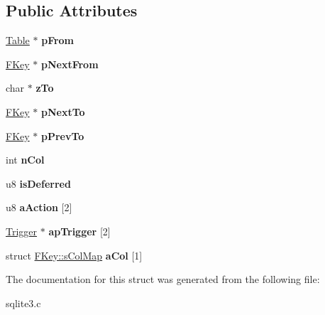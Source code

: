 \subsection*{Public Attributes}
\begin{DoxyCompactItemize}
\item 
\hypertarget{struct_f_key_a6d476f3fbfa75a19c5c5a9edec4e79eb}{\hyperlink{struct_table}{Table} $\ast$ {\bfseries p\-From}}\label{struct_f_key_a6d476f3fbfa75a19c5c5a9edec4e79eb}

\item 
\hypertarget{struct_f_key_ac64ff66b30167715c8822a74c2809075}{\hyperlink{struct_f_key}{F\-Key} $\ast$ {\bfseries p\-Next\-From}}\label{struct_f_key_ac64ff66b30167715c8822a74c2809075}

\item 
\hypertarget{struct_f_key_a1eac10bab38a0ac9f88306fbbabbe5d6}{char $\ast$ {\bfseries z\-To}}\label{struct_f_key_a1eac10bab38a0ac9f88306fbbabbe5d6}

\item 
\hypertarget{struct_f_key_ac29b26999113602e7e3921bf07643c04}{\hyperlink{struct_f_key}{F\-Key} $\ast$ {\bfseries p\-Next\-To}}\label{struct_f_key_ac29b26999113602e7e3921bf07643c04}

\item 
\hypertarget{struct_f_key_a56189e420e91df86513e6895db518eca}{\hyperlink{struct_f_key}{F\-Key} $\ast$ {\bfseries p\-Prev\-To}}\label{struct_f_key_a56189e420e91df86513e6895db518eca}

\item 
\hypertarget{struct_f_key_a611e3223f3f434e0a635e036dc100cbb}{int {\bfseries n\-Col}}\label{struct_f_key_a611e3223f3f434e0a635e036dc100cbb}

\item 
\hypertarget{struct_f_key_ab742714b17f2c13353837e1fdde51cc7}{u8 {\bfseries is\-Deferred}}\label{struct_f_key_ab742714b17f2c13353837e1fdde51cc7}

\item 
\hypertarget{struct_f_key_a68a08f58294bf845e9c77d785499d222}{u8 {\bfseries a\-Action} \mbox{[}2\mbox{]}}\label{struct_f_key_a68a08f58294bf845e9c77d785499d222}

\item 
\hypertarget{struct_f_key_a9ce15cb27b675836bc714ab18fd8a008}{\hyperlink{struct_trigger}{Trigger} $\ast$ {\bfseries ap\-Trigger} \mbox{[}2\mbox{]}}\label{struct_f_key_a9ce15cb27b675836bc714ab18fd8a008}

\item 
\hypertarget{struct_f_key_a5b230bc6c10a67f432ed7d5ebc92bcd2}{struct \hyperlink{struct_f_key_1_1s_col_map}{F\-Key\-::s\-Col\-Map} {\bfseries a\-Col} \mbox{[}1\mbox{]}}\label{struct_f_key_a5b230bc6c10a67f432ed7d5ebc92bcd2}

\end{DoxyCompactItemize}


The documentation for this struct was generated from the following file\-:\begin{DoxyCompactItemize}
\item 
sqlite3.\-c\end{DoxyCompactItemize}
